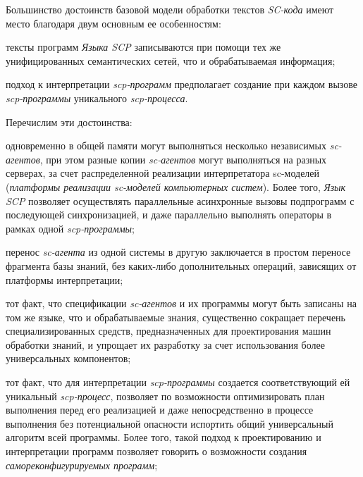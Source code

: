 \begin{SCn}
{Большинство достоинств базовой модели обработки текстов \textit{SC-кода}
имеют место благодаря двум основным ее особенностям:

\begin{scnitemize}
\item
  тексты программ \textit{Языка SCP} записываются при помощи тех же
  унифицированных семантических сетей, что и обрабатываемая информация;
\item
  подход к интерпретации \textit{scp-программ} предполагает создание при
  каждом вызове \textit{scp-программы} уникального \textit{scp-процесса}.
\end{scnitemize}

Перечислим эти достоинства:

\begin{scnitemize}
\item
  одновременно в общей памяти могут выполняться несколько независимых
  \textit{sc-агентов}, при этом разные копии \textit{sc-агентов} могут выполняться на разных
  серверах, за счет распределенной реализации интерпретатора sc-моделей
  (\textit{платформы реализации sc-моделей компьютерных систем}). Более
  того, \textit{Язык SCP} позволяет осуществлять параллельные асинхронные
  вызовы подпрограмм с последующей синхронизацией, и даже параллельно
  выполнять операторы в рамках одной \textit{scp-программы};
\item
  перенос \textit{sc-агента} из одной системы в другую заключается в простом
  переносе фрагмента базы знаний, без каких-либо дополнительных
  операций, зависящих от платформы интерпретации;
\item
  тот факт, что спецификации \textit{sc-агентов} и их программы могут быть записаны
  на том же языке, что и обрабатываемые знания, существенно сокращает
  перечень специализированных средств, предназначенных для
  проектирования машин обработки знаний, и упрощает их разработку за
  счет использования более универсальных компонентов;
\item
  тот факт, что для интерпретации \textit{scp-программы} создается
  соответствующий ей уникальный \textit{scp-процесс}, позволяет по
  возможности оптимизировать план выполнения перед его реализацией и
  даже непосредственно в процессе выполнения без потенциальной опасности
  испортить общий универсальный алгоритм всей программы. Более того,
  такой подход к проектированию и интерпретации программ позволяет
  говорить о возможности создания \textit{самореконфигурируемых программ};
  
\end{scnitemize}

}
\end{SCn}
